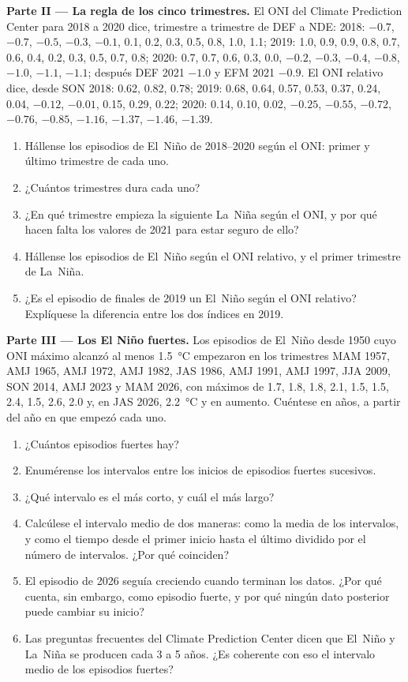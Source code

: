 \begin{problem}
\medskip\noindent\textbf{Parte II --- La regla de los cinco trimestres.}
El ONI del Climate Prediction Center para 2018 a 2020 dice, trimestre a trimestre de DEF a
NDE: 2018: $-0.7$, $-0.7$, $-0.5$, $-0.3$, $-0.1$, 0.1, 0.2, 0.3, 0.5, 0.8, 1.0, 1.1; 2019: 1.0,
0.9, 0.9, 0.8, 0.7, 0.6, 0.4, 0.2, 0.3, 0.5, 0.7, 0.8; 2020: 0.7, 0.7, 0.6, 0.3, 0.0, $-0.2$,
$-0.3$, $-0.4$, $-0.8$, $-1.0$, $-1.1$, $-1.1$; después DEF 2021 $-1.0$ y EFM 2021 $-0.9$. El
ONI relativo dice, desde SON 2018: 0.62, 0.82, 0.78; 2019: 0.68, 0.64, 0.57, 0.53, 0.37, 0.24,
0.04, $-0.12$, $-0.01$, 0.15, 0.29, 0.22; 2020: 0.14, 0.10, 0.02, $-0.25$, $-0.55$, $-0.72$,
$-0.76$, $-0.85$, $-1.16$, $-1.37$, $-1.46$, $-1.39$.
\begin{enumerate}[resume]
  \item Hállense los episodios de El~Niño de 2018--2020 según el ONI: primer y último trimestre de cada uno.
  \item ¿Cuántos trimestres dura cada uno?
  \item ¿En qué trimestre empieza la siguiente La~Niña según el ONI, y por qué hacen falta los
        valores de 2021 para estar seguro de ello?
  \item Hállense los episodios de El~Niño según el ONI relativo, y el primer trimestre de La~Niña.
  \item ¿Es el episodio de finales de 2019 un El~Niño según el ONI relativo? Explíquese la diferencia
        entre los dos índices en 2019.
\end{enumerate}

\medskip\noindent\textbf{Parte III --- Los El Niño fuertes.}
Los episodios de El~Niño desde 1950 cuyo ONI máximo alcanzó al menos \qty{1.5}{\celsius} empezaron en los
trimestres MAM 1957, AMJ 1965, AMJ 1972, AMJ 1982, JAS 1986, AMJ 1991, AMJ 1997, JJA 2009, SON 2014,
AMJ 2023 y MAM 2026, con máximos de 1.7, 1.8, 1.8, 2.1, 1.5, 1.5, 2.4, 1.5, 2.6, 2.0 y, en
JAS 2026, \qty{2.2}{\celsius} y en aumento. Cuéntese en años, a partir del año en que empezó cada uno.
\begin{enumerate}[resume]
  \item ¿Cuántos episodios fuertes hay?
  \item Enumérense los intervalos entre los inicios de episodios fuertes sucesivos.
  \item ¿Qué intervalo es el más corto, y cuál el más largo?
  \item Calcúlese el intervalo medio de dos maneras: como la media de los intervalos, y como el tiempo
        desde el primer inicio hasta el último dividido por el número de intervalos. ¿Por qué coinciden?
  \item El episodio de 2026 seguía creciendo cuando terminan los datos. ¿Por qué cuenta, sin embargo,
        como episodio fuerte, y por qué ningún dato posterior puede cambiar su inicio?
  \item Las preguntas frecuentes del Climate Prediction Center dicen que El~Niño y La~Niña se producen cada 3 a 5
        años. ¿Es coherente con eso el intervalo medio de los episodios fuertes?
\end{enumerate}


\end{problem}
